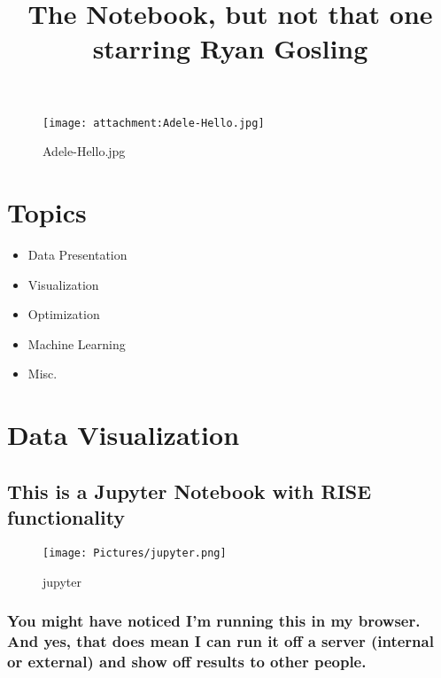 \documentclass[11pt]{article}
\title{The Notebook, but not that one starring Ryan Gosling }
\makeatletter
\def\maxwidth{\ifdim\Gin@nat@width>\linewidth\linewidth
    \else\Gin@nat@width\fi}
\let\Oldincludegraphics\includegraphics
\renewcommand{\includegraphics}[1]{\Oldincludegraphics[width=.8\maxwidth]{#1}}
\providecommand{\tightlist}{%
      \setlength{\itemsep}{0pt}\setlength{\parskip}{0pt}}
\makeatother
\begin{document}
    
    
    \maketitle
    
    

    
    \begin{figure}
\centering
\texttt{[image: attachment:Adele-Hello.jpg]}
\caption{Adele-Hello.jpg}
\end{figure}

    \section{Topics}\label{topics}

\begin{itemize}
\tightlist
\item
  Data Presentation
\item
  Visualization
\item
  Optimization
\item
  Machine Learning
\item
  Misc.
\end{itemize}

    \section{Data Visualization}\label{data-visualization}

\subsection{This is a Jupyter Notebook with RISE
functionality}\label{this-is-a-jupyter-notebook-with-rise-functionality}

\begin{figure}
\centering
\texttt{[image: Pictures/jupyter.png]}
\caption{jupyter}
\end{figure}

    \subsubsection{You might have noticed I'm running this in my browser.
And yes, that does mean I can run it off a server (internal or external)
and show off results to other
people.}\label{you-might-have-noticed-im-running-this-in-my-browser.-and-yes-that-does-mean-i-can-run-it-off-a-server-internal-or-external-and-show-off-results-to-other-people.}
\end{document}
